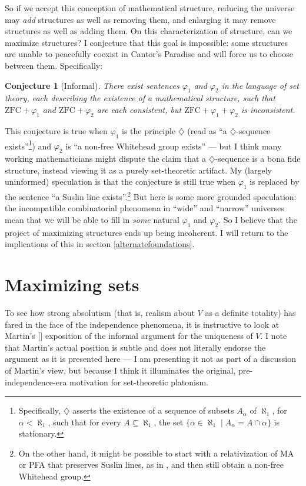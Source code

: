 \documentclass[letterpaper,12pt]{article}
\newcommand{\ZFC}{\mathrm{ZFC}}
\renewcommand{\phi}{\varphi}
\newtheorem{conjecture}{Conjecture}
\begin{document}
So if we accept this conception of mathematical structure, reducing the universe may \emph{add} structures as well as removing them, and enlarging it may remove structures as well as adding them. On this characterization of structure, can we maximize structures? I conjecture that this goal is impossible: some structures are unable to peacefully coexist in Cantor's Paradise and will force us to choose between them. Specifically:

\begin{conjecture}[Informal]
There exist sentences $\phi_1$ and $\phi_2$ in the language of set theory, each describing the existence of a mathematical structure, such that $\ZFC + \phi_1$ and $\ZFC + \phi_2$ are each consistent, but $\ZFC + \phi_1 + \phi_2$ is inconsistent.
\end{conjecture}

This conjecture is true when $\phi_1$ is the principle $\diamondsuit$ (read as ``a $\diamondsuit$-sequence exists''\footnote{Specifically, $\diamondsuit$ asserts the existence of a sequence of subsets $A_\alpha$ of $\aleph_1$, for $\alpha < \aleph_1$, such that for every $A \subseteq \aleph_1$, the set $\{\alpha \in \aleph_1 \mid A_\alpha = A \cap \alpha\}$ is stationary.}) and $\phi_2$ is ``a non-free Whitehead group exists'' --- but I think many working mathematicians might dispute the claim that a $\diamondsuit$-sequence is a bona fide structure, instead viewing it as a purely set-theoretic artifact. My (largely uninformed) speculation is that the conjecture is still true when $\phi_1$ is replaced by the sentence ``a Suslin line exists''.\footnote{On the other hand, it might be possible to start with a relativization of MA or PFA that preserves Suslin lines, as in \cite{todorcevic2011forcing}, and then still obtain a non-free Whitehead group.} But here is some more grounded speculation: the incompatible combinatorial phenomena in ``wide'' and ``narrow'' universes mean that we will be able to fill in \emph{some} natural $\phi_1$ and $\phi_2$. So I believe that the project of maximizing structures ends up being incoherent. I will return to the implications of this in section \ref{alternatefoundations}.


\section{Maximizing sets}
\label{maximizingsets}
To see how strong absolutism (that is, realism about $V$ as a definite totality) has fared in the face of the independence phenomena, it is instructive to look at Martin's [\citeyear{martin2012completeness}] exposition of the informal argument for the uniqueness of $V$. I note that Martin's actual position is subtle and does not literally endorse the argument as it is presented here --- I am presenting it not as part of a discussion of Martin's view, but because I think it illuminates the original, pre-independence-era motivation for set-theoretic platonism.
\end{document}
